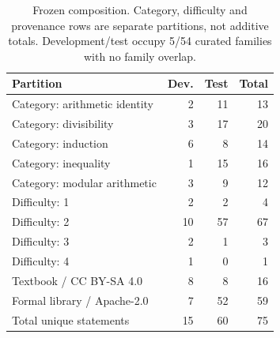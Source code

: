 \begin{table}[t]
\centering
\caption{Frozen composition. Category, difficulty and provenance rows are separate partitions, not additive totals. Development/test occupy 5/54 curated families with no family overlap.}
\label{tab:dataset}
\small
\begin{tabular}{lrrr}
\toprule
Partition & Dev. & Test & Total \\
\midrule
Category: arithmetic identity & 2 & 11 & 13 \\
Category: divisibility & 3 & 17 & 20 \\
Category: induction & 6 & 8 & 14 \\
Category: inequality & 1 & 15 & 16 \\
Category: modular arithmetic & 3 & 9 & 12 \\
Difficulty: 1 & 2 & 2 & 4 \\
Difficulty: 2 & 10 & 57 & 67 \\
Difficulty: 3 & 2 & 1 & 3 \\
Difficulty: 4 & 1 & 0 & 1 \\
Textbook / CC BY-SA 4.0 & 8 & 8 & 16 \\
Formal library / Apache-2.0 & 7 & 52 & 59 \\
Total unique statements & 15 & 60 & 75 \\
\bottomrule
\end{tabular}
\end{table}
